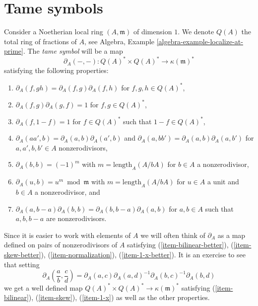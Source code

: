 \section{Tame symbols}
\label{chow-section-tame-symbol}
Consider a Noetherian local ring $(A, \mathfrak m)$ of dimension $1$.
We denote $Q(A)$ the total ring of fractions of $A$, see
Algebra, Example \ref{algebra-example-localize-at-prime}.
The {\it tame symbol} will be a map
$$
\partial_A(-, -) : Q(A)^* \times Q(A)^* \longrightarrow \kappa(\mathfrak m)^*
$$
satisfying the following properties:
\begin{enumerate}
\item $\partial_A(f, gh) = \partial_A(f, g) \partial_A(f, h)$
\label{chow-item-bilinear}
for $f, g, h \in Q(A)^*$,
\item $\partial_A(f, g) \partial_A(g, f) = 1$
\label{chow-item-skew}
for $f, g \in Q(A)^*$,
\item $\partial_A(f, 1 - f) = 1$
\label{chow-item-1-x}
for $f \in Q(A)^*$ such that $1 - f \in Q(A)^*$,
\item $\partial_A(aa', b) = \partial_A(a, b)\partial_A(a', b)$
\label{chow-item-bilinear-better}
and $\partial_A(a, bb') = \partial_A(a, b)\partial_A(a, b')$
for $a, a', b, b' \in A$ nonzerodivisors,
\item $\partial_A(b, b) = (-1)^m$
\label{chow-item-skew-better}
with $m = \text{length}_A(A/bA)$
for $b \in A$ a nonzerodivisor,
\item $\partial_A(u, b) = u^m \bmod \mathfrak m$
\label{chow-item-normalization}
with $m = \text{length}_A(A/bA)$ for $u \in A$ a unit and
$b \in A$ a nonzerodivisor, and
\item
\label{chow-item-1-x-better}
$\partial_A(a, b - a)\partial_A(b, b) = \partial_A(b, b - a)\partial_A(a, b)$
for $a, b \in A$ such that $a, b, b - a$ are nonzerodivisors.
\end{enumerate}
Since it is easier to work with elements of $A$ we will
often think of $\partial_A$ as a map defined on pairs of
nonzerodivisors of $A$ satisfying (\ref{item-bilinear-better}),
(\ref{item-skew-better}), (\ref{item-normalization}),
(\ref{item-1-x-better}). It is an exercise to see that
setting
$$
\partial_A(\frac{a}{b}, \frac{c}{d}) =
\partial_A(a, c) \partial_A(a, d)^{-1} \partial_A(b, c)^{-1} \partial_A(b, d)
$$
we get a well defined map $Q(A)^* \times Q(A)^* \to \kappa(\mathfrak m)^*$
satisfying (\ref{item-bilinear}), (\ref{item-skew}), (\ref{item-1-x})
as well as the other properties.

